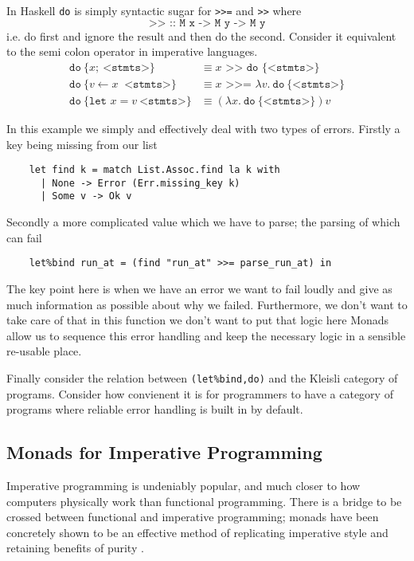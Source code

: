 In Haskell \texttt{do} is simply syntactic sugar for \texttt{>>=} and \texttt{>>} where
\begin{equation}
    \texttt{>> :: M x -> M y -> M y}
\end{equation}
i.e. do first and ignore the result and then do the second.
Consider it equivalent to the semi colon operator in imperative languages.
\begin{align}
    \texttt{do}\ \{ x;\ \texttt{<stmts>} \}
    &\equiv x \texttt{ >> do \{<stmts>\}}
    \\
    \texttt{do}\ \{ v \leftarrow x\ \texttt{ <stmts>}\}
    &\equiv x \texttt{ >>= } \lambda v.\ \texttt{do}\ \{ \texttt{<stmts>} \}
    \\
    \texttt{do}\ \{\texttt{let }x = v\ \texttt{<stmts>}\}
    &\equiv (\lambda x.\ \texttt{do}\ \{ \texttt{<stmts>} \})v
\end{align}

In this example we simply and effectively deal with two types of errors.
Firstly a key being missing from our list
\begin{verbatim}
    let find k = match List.Assoc.find la k with
      | None -> Error (Err.missing_key k)
      | Some v -> Ok v
\end{verbatim}
Secondly a more complicated value which we have to parse;
the parsing of which can fail
\begin{verbatim}
    let%bind run_at = (find "run_at" >>= parse_run_at) in
\end{verbatim}
The key point here is when we have an error we want to fail
loudly and give as much information as possible about why we failed.
Furthermore, we don't want to take care of that in this function
we don't want to put that logic here
Monads allow us to sequence this error handling
and keep the necessary logic in a sensible re-usable place.

Finally consider the relation between
\texttt{(let\%bind,do)} and the Kleisli category of programs.
Consider how convienent it is for programmers to have a category
of programs where reliable error handling is built in by default.

\subsection{Monads for Imperative Programming}
Imperative programming is undeniably popular,
and much closer to how computers physically work than functional programming.
There is a bridge to be crossed between functional and imperative programming;
monads have been concretely shown to be an effective method of replicating
imperative style and retaining benefits of purity \cite{PeytonJones:1993}.

